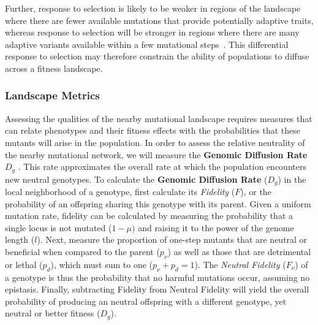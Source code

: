 \documentclass[10pt,letterpaper]{article}
\begin{document}
Further, response to selection is likely to be weaker in regions of the landscape where there are fewer available mutations that provide potentially adaptive traits, whereas response to selection will be stronger in regions where there are many adaptive variants available within a few mutational steps~\cite{alberch_genes_1991,carter_role_2005}. This differential response to selection may therefore constrain the ability of populations to diffuse across a fitness landscape.

\subsubsection*{Landscape Metrics}
Assessing the qualities of the nearby mutational landscape requires measures that can relate phenotypes and their fitness effects with the probabilities that these mutants will arise in the population. In order to assess the relative neutrality of the nearby mutational network, we will measure the \textbf{Genomic Diffusion Rate} $D_g$ \cite{ofria_evolution_2002}. This rate approximates the overall rate at which the population encounters new neutral genotypes.
To calculate the \textbf{Genomic Diffusion Rate} ($D_g$) in the local neighborhood of a genotype, first calculate its \textit{Fidelity} ($F$), or the probability of an offspring sharing this genotype with its parent.  Given a uniform mutation rate, fidelity
can be calculated by measuring the probability that a single locus is not mutated ($1-\mu)$ and raising it to the power of the genome length ($l$). Next, measure the proportion of one-step mutants that are neutral or beneficial when compared to the parent ($p_\nu$) as well as those that are detrimental or lethal ($p_d$), which must sum to one ($p_\nu + p_d = 1$).  The \textit{Neutral Fidelity} ($F_\nu$) of a genotype is thus the probability that no harmful mutations occur, assuming no epistasis. Finally, subtracting Fidelity from Neutral Fidelity will yield the overall probability of producing an neutral offspring with a different genotype, yet neutral or better fitness ($D_g$).
\end{document}
